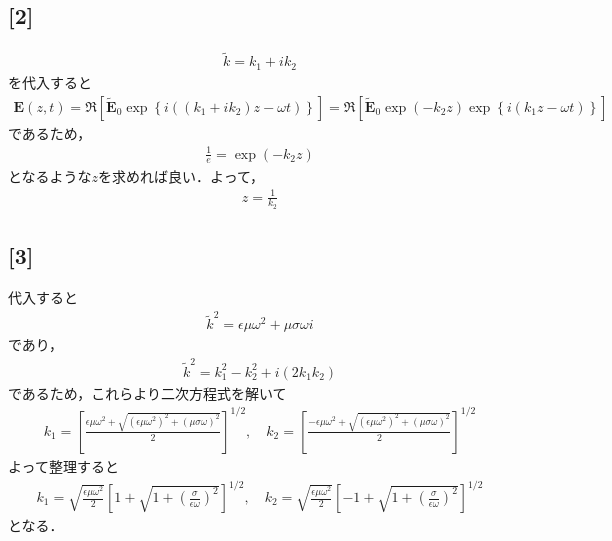 \documentclass[12pt,dvipdfmx]{jsarticle}
\begin{document}
\subsection*{\large{[2]}}
\begin{eqnarray}
  \tilde{k} = k_1+ik_2
\end{eqnarray}
を代入すると
\begin{eqnarray}
  \bm{E}(z,t) = \Re\left[ \tilde{\bm{E}}_0 \exp\left\{ i( ( k_1+ik_2)z-\omega t ) \right\} \right] =  \Re\left[ \tilde{\bm{E}}_0\exp\left( -k_2z \right) \exp\left\{ i( k_1z-\omega t ) \right\} \right] 
\end{eqnarray}
であるため，
\begin{eqnarray}
  \frac{1}{e} = \exp (-k_2z)
\end{eqnarray}
となるような$z$を求めれば良い．よって，
\begin{eqnarray}
  z = \frac{1}{k_2}
\end{eqnarray}
\subsection*{\large{[3]}}
代入すると
\begin{eqnarray}
  \tilde{k}^2 =\epsilon\mu\omega^2 + \mu \sigma \omega i
\end{eqnarray}
であり，
\begin{eqnarray}
  \tilde{k}^2 = k_1^2-k_2^2 + i(2k_1k_2)
\end{eqnarray}
であるため，これらより二次方程式を解いて
\begin{eqnarray}
  k_1 = \left[ \frac{\epsilon\mu \omega^2+\sqrt{ (\epsilon\mu \omega^2)^2 + (\mu\sigma\omega)^2 }}{2} \right]^{1/2},\quad k_2 = \left[ \frac{-\epsilon\mu \omega^2+\sqrt{ (\epsilon\mu \omega^2)^2 + (\mu\sigma\omega)^2 }}{2} \right]^{1/2}
\end{eqnarray}
よって整理すると
\begin{eqnarray}
  k_1 = \sqrt{\frac{\epsilon\mu\omega^2}{2}}\left[ 1+\sqrt{1+\left(\frac{\sigma}{\epsilon\omega}\right)^2} \right]^{1/2},\quad k_2 = \sqrt{\frac{\epsilon\mu\omega^2}{2}}\left[ -1+\sqrt{1+\left(\frac{\sigma}{\epsilon\omega}\right)^2} \right]^{1/2}
\end{eqnarray}
となる．
\end{document}
